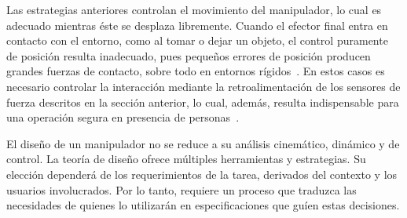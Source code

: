 Las estrategias anteriores controlan el movimiento del manipulador, lo cual es adecuado mientras éste se desplaza libremente. Cuando el efector final entra en contacto con el entorno, como al tomar o dejar un objeto, el control puramente de posición resulta inadecuado, pues pequeños errores de posición producen grandes fuerzas de contacto, sobre todo en entornos rígidos~\cite{handbook_force,craig}. En estos casos es necesario controlar la interacción mediante la retroalimentación de los sensores de fuerza descritos en la sección anterior, lo cual, además, resulta indispensable para una operación segura en presencia de personas~\cite{handbook_force}.

El diseño de un manipulador no se reduce a su análisis cinemático, dinámico y de control. La teoría de diseño ofrece múltiples herramientas y estrategias. Su elección dependerá de los requerimientos de la tarea, derivados del contexto y los usuarios involucrados. Por lo tanto, requiere un proceso que traduzca las necesidades de quienes lo utilizarán en especificaciones que guíen estas decisiones.